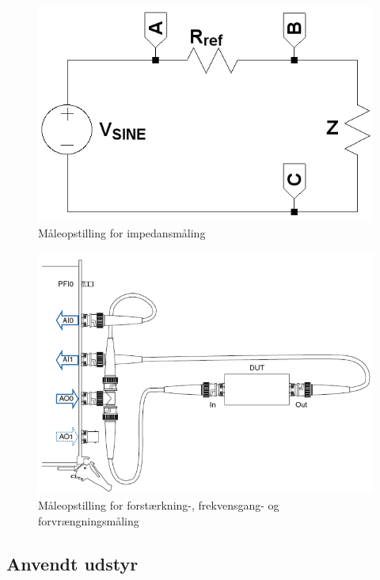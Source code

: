 \begin{figure}[h]
\centering
\includegraphics[scale=0.4]{maalerapporter/indgangsvaelger/impedansopstilling-forforstaerker.png}
\caption{Måleopstilling for impedansmåling}
\label{fig:indgang:maaleop-imp}
\end{figure}

\begin{figure}[h]
\centering
\includegraphics[scale=0.4]{maalerapporter/indgangsvaelger/maaleopstilling-thd-forforstaerker.png}
\caption{Måleopstilling for forstærkning-, frekvensgang- og forvrængningsmåling}
\label{fig:indgang:maaleop-thd}
\end{figure}

\subsection*{Anvendt udstyr}
\label{indgang:maalejournal_anvendtudstyr}

